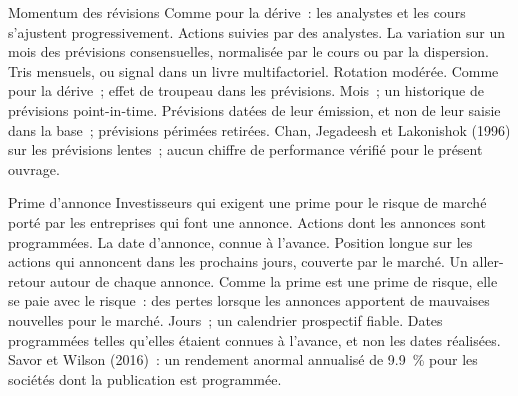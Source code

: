 \begin{strategyfile}{Momentum des révisions}\label{strat:s1:earnings:revision}
 Comme pour la dérive~: les analystes et les cours s'ajustent progressivement.
 Actions suivies par des analystes.
 La variation sur un mois des prévisions consensuelles, normalisée par le cours ou par la dispersion.
 Tris mensuels, ou signal dans un livre multifactoriel.
 Rotation modérée.
 Comme pour la dérive~; effet de troupeau dans les prévisions.
 Mois~; un historique de prévisions point-in-time.
 Prévisions datées de leur émission, et non de leur saisie dans la base~; prévisions périmées retirées.
 Chan, Jegadeesh et Lakonishok (1996) sur les prévisions lentes~; aucun chiffre de performance vérifié pour le présent ouvrage.
\end{strategyfile}

\begin{strategyfile}{Prime d'annonce}\label{strat:s1:earnings:premium}
 Investisseurs qui exigent une prime pour le risque de marché porté par les entreprises qui font une annonce.
 Actions dont les annonces sont programmées.
 La date d'annonce, connue à l'avance.
 Position longue sur les actions qui annoncent dans les prochains jours, couverte par le marché.
 Un aller-retour autour de chaque annonce.
 Comme la prime est une prime de risque, elle se paie avec le risque~: des pertes lorsque les annonces apportent de mauvaises nouvelles pour le marché.
 Jours~; un calendrier prospectif fiable.
 Dates programmées telles qu'elles étaient connues à l'avance, et non les dates réalisées.
 Savor et Wilson (2016)~: un rendement anormal annualisé de 9.9~\% pour les sociétés dont la publication est programmée.
\end{strategyfile}

